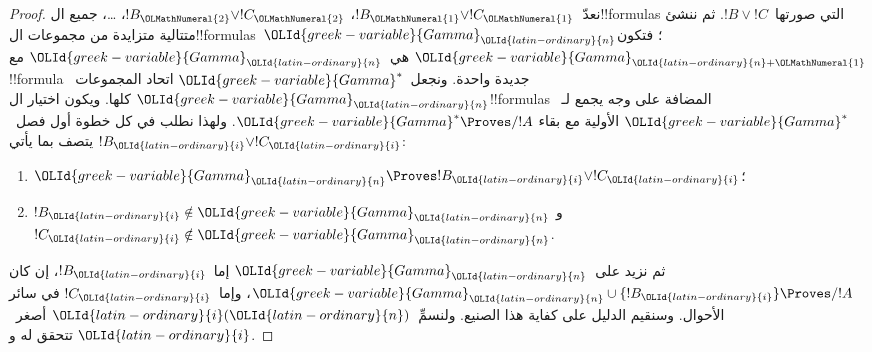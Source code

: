 \documentclass[../../../include/open-logic-section]{subfiles}
\begin{document}
\begin{proof}
  نعدّ~$!B_{\OLMathNumeral{1}} \lor !C_{\OLMathNumeral{1}}$، $!B_{\OLMathNumeral{2}} \lor !C_{\OLMathNumeral{2}}$، \dots، جميع
  ال!!{formula}s التي صورتها~$!B \lor !C$. ثم ننشئ متتالية متزايدة من
  مجموعات ال!!{formula}s~${\OLId{greek-variable}{Gamma}}_{\OLId{latin-ordinary}{n}}$؛ فتكون
  ${\OLId{greek-variable}{Gamma}}_{{\OLId{latin-ordinary}{n}}+{\OLMathNumeral{1}}}$ هي~${\OLId{greek-variable}{Gamma}}_{\OLId{latin-ordinary}{n}}$ مع !!{formula} جديدة واحدة.
  ونجعل~${\OLId{greek-variable}{Gamma}}^*$ اتحاد المجموعات~${\OLId{greek-variable}{Gamma}}_{\OLId{latin-ordinary}{n}}$ كلها. ويكون اختيار
  ال!!{formula}s المضافة على وجه يجمع لـ~${\OLId{greek-variable}{Gamma}}^*$ الأولية مع بقاء
  ${\OLId{greek-variable}{Gamma}}^* \Proves/ !A$. ولهذا نطلب في كل خطوة أول فصل~$!B_{\OLId{latin-ordinary}{i}} \lor !C_{\OLId{latin-ordinary}{i}}$
  يتصف بما يأتي:
  \begin{enumerate}
  \item{} ${\OLId{greek-variable}{Gamma}}_{\OLId{latin-ordinary}{n}} \Proves !B_{\OLId{latin-ordinary}{i}} \lor !C_{\OLId{latin-ordinary}{i}}$؛
  \item{} $!B_{\OLId{latin-ordinary}{i}} \notin {\OLId{greek-variable}{Gamma}}_{\OLId{latin-ordinary}{n}}$ و
    $!C_{\OLId{latin-ordinary}{i}} \notin {\OLId{greek-variable}{Gamma}}_{\OLId{latin-ordinary}{n}}$.
  \end{enumerate}
  ثم نزيد على~${\OLId{greek-variable}{Gamma}}_{\OLId{latin-ordinary}{n}}$ إما~$!B_{\OLId{latin-ordinary}{i}}$، إن كان
  ${\OLId{greek-variable}{Gamma}}_{\OLId{latin-ordinary}{n}} \cup \{!B_{\OLId{latin-ordinary}{i}}\} \Proves/ !A$، وإما~$!C_{\OLId{latin-ordinary}{i}}$ في سائر الأحوال.
  وسنقيم الدليل على كفاية هذا الصنيع. ولنسمِّ~${\OLId{latin-ordinary}{i}}({\OLId{latin-ordinary}{n}})$ أصغر~${\OLId{latin-ordinary}{i}}$ تتحقق له
   و.


\end{proof}
\end{document}
